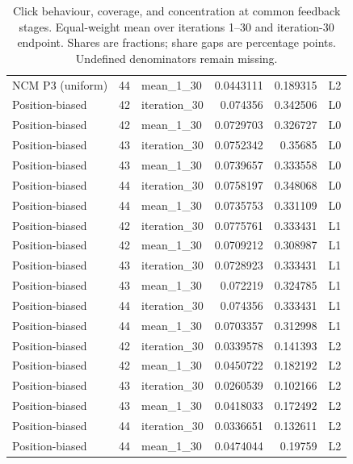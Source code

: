 \begin{table}[htbp!]
\begin{tabular}{lrlrrl}
NCM P3 (uniform) & 44 & mean\_1\_30 & 0.0443111 & 0.189315 & L2 \\
Position-biased & 42 & iteration\_30 & 0.074356 & 0.342506 & L0 \\
Position-biased & 42 & mean\_1\_30 & 0.0729703 & 0.326727 & L0 \\
Position-biased & 43 & iteration\_30 & 0.0752342 & 0.35685 & L0 \\
Position-biased & 43 & mean\_1\_30 & 0.0739657 & 0.333558 & L0 \\
Position-biased & 44 & iteration\_30 & 0.0758197 & 0.348068 & L0 \\
Position-biased & 44 & mean\_1\_30 & 0.0735753 & 0.331109 & L0 \\
Position-biased & 42 & iteration\_30 & 0.0775761 & 0.333431 & L1 \\
Position-biased & 42 & mean\_1\_30 & 0.0709212 & 0.308987 & L1 \\
Position-biased & 43 & iteration\_30 & 0.0728923 & 0.333431 & L1 \\
Position-biased & 43 & mean\_1\_30 & 0.072219 & 0.324785 & L1 \\
Position-biased & 44 & iteration\_30 & 0.074356 & 0.333431 & L1 \\
Position-biased & 44 & mean\_1\_30 & 0.0703357 & 0.312998 & L1 \\
Position-biased & 42 & iteration\_30 & 0.0339578 & 0.141393 & L2 \\
Position-biased & 42 & mean\_1\_30 & 0.0450722 & 0.182192 & L2 \\
Position-biased & 43 & iteration\_30 & 0.0260539 & 0.102166 & L2 \\
Position-biased & 43 & mean\_1\_30 & 0.0418033 & 0.172492 & L2 \\
Position-biased & 44 & iteration\_30 & 0.0336651 & 0.132611 & L2 \\
Position-biased & 44 & mean\_1\_30 & 0.0474044 & 0.19759 & L2 \\
\hline
\end{tabular}
\caption{Click behaviour, coverage, and concentration at common feedback stages. Equal-weight mean over iterations 1--30 and iteration-30 endpoint. Shares are fractions; share gaps are percentage points. Undefined denominators remain missing.}
\label{chap:results:tab:rq2_models_coverage}
\end{table}
